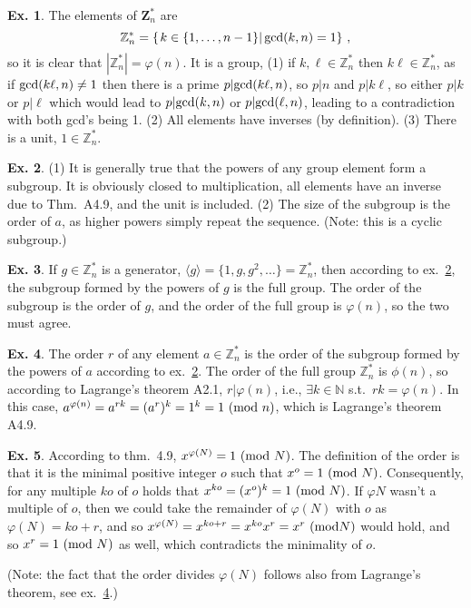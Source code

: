 \documentclass[a4paper,12pt]{article}
\theoremstyle{definition}
\newtheorem{exercise}{Ex.}[section]
\begin{document}
\begin{exercise}
 The elements of $\mathbf{Z}_n^*$ are
 \[
  \mathbb{Z}_n^* = \left\{\left. k\in \{1,\dots, n-1\} \right| {\rm gcd}(k,n)=1\right\}\,,
 \]
 so it is clear that $|\mathbb{Z}_n^*| = \varphi(n)$. It is a group, (1) if $k,\ell\in \mathbb{Z}_n^*$ then $k\ell\in \mathbb{Z}_n^*$, as if ${\rm gcd}(k\ell,n)\ne 1$ then there is a prime $p|{\rm gcd}(k\ell,n)$, so $p|n$ and $p|k\ell$, so either $p|k$ or $p|\ell$ which would lead to $p|{\rm gcd}(k,n)$ or $p|{\rm gcd}(\ell,n)$, leading to a contradiction with both gcd's being 1. (2) All elements have inverses (by definition). (3) There is a unit, $1\in\mathbb{Z}_n^*$.
\end{exercise}

\begin{exercise}\label{ex:cyclSG}
 (1) It is generally true that the powers of any group element form a subgroup. It is obviously closed to multiplication, all elements have an inverse due to Thm.~A4.9, and the unit is included. (2) The size of the subgroup is the order of $a$, as higher powers simply repeat the sequence. (Note: this is a cyclic subgroup.)
\end{exercise}

\begin{exercise}
 If $g\in \mathbb{Z}_n^*$ is a generator, $\langle g\rangle=\{1,g,g^2, \dots\}=\mathbb{Z}_n^*$, then according to ex.~\ref{ex:cyclSG}, the subgroup formed by the powers of $g$ is the full group. The order of the subgroup is the order of $g$, and the order of the full group is $\varphi(n)$, so the two must agree.
\end{exercise}

\begin{exercise}\label{ex:LagrangeOrder}
 The order $r$ of any element $a\in\mathbb{Z}_n^*$ is the order of the subgroup formed by the powers of $a$ according to ex.~\ref{ex:cyclSG}. The order of the full group $\mathbb{Z}_n^*$ is $\phi(n)$, so according to Lagrange's theorem A2.1, $r|\varphi(n)$, i.e., $\exists k\in\mathbb{N}$ s.t.\ $rk=\varphi(n)$. In this case, $a^{\varphi(n)}=a^{rk}=(a^r)^k=1^k=1\ ({\rm mod\ }n)$, which is Lagrange's theorem A4.9.
\end{exercise}


\begin{exercise}
 According to thm.~4.9, $x^{\varphi(N)} = 1\ ({\rm mod\ }N)$. The definition of the order is that it is the minimal positive integer $o$ such that $x^o=1\ ({\rm mod\ }N)$. Consequently, for any multiple $ko$ of $o$ holds that $x^{ko}=(x^o)^k=1\ ({\rm mod\ }N)$. If $\varphi{N}$ wasn't a multiple of $o$, then we could take the remainder of $\varphi(N)$ with $o$ as $\varphi(N)=ko+r$, and so $x^{\varphi(N)} = x^{ko+r}=x^{ko}x^r=x^r\ ({\rm mod} N)$ would hold, and so $x^r=1\ ({\rm mod\ }N)$ as well, which contradicts the minimality of $o$.
 
 (Note: the fact that the order divides $\varphi(N)$ follows also from Lagrange's theorem, see ex.~\ref{ex:LagrangeOrder}.)
\end{exercise}
\end{document}
